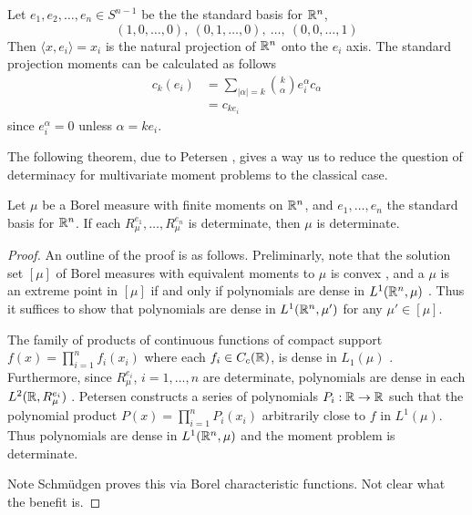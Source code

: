 \begin{myexample}
  Let $e_1, e_2, \ldots, e_n \in S^{n-1}$ be the the standard basis for $\mathbb{R}^n$,
  \[
    (1, 0, \ldots, 0),~ (0, 1, \ldots, 0),~ \ldots,~ (0,0, \ldots, 1)
  \]
  Then $\langle x, e_i \rangle = x_i$ is the natural projection of $\mathbb{R}^n$ onto the $e_i$ axis. The standard projection moments can be calculated as follows
  \begin{align*}
    c_k(e_i) 
    &= \sum_{|\alpha| = k} \binom{k}{\alpha} e_i^\alpha c_\alpha \\
    &= c_{ke_i}
  \end{align*}
  since $e_i^\alpha = 0$ unless $\alpha = ke_i$.
\end{myexample}

The following theorem, due to Petersen \cn, gives a way us to reduce the question of determinacy for multivariate moment problems to the classical case.

\begin{proposition}
  Let $\mu$ be a Borel measure with finite moments on $\mathbb{R}^n$, and $e_1, \ldots, e_n$ the standard basis for $\mathbb{R}^n$. If each $R_\mu^{e_1}, \ldots, R_\mu^{e_n}$ is determinate, then $\mu$ is determinate.
\end{proposition}

\begin{proof}
  An outline of the proof is as follows. Preliminarly, note that the solution set $[\mu]$ of Borel measures with equivalent moments to $\mu$ is convex \cn, and a $\mu$ is an extreme point in $[\mu]$ if and only if polynomials are dense in $L^1(\mathbb{R}^n, \mu)$ \cn. Thus it suffices to show that polynomials are dense in $L^1(\mathbb{R}^n, \mu')$ for any $\mu' \in [\mu]$.
  
  The family of products of continuous functions of compact support $f(x) = \prod_{i=1}^n f_i(x_i)$ where each $f_i \in C_c(\mathbb{R})$, is dense in $L_1(\mu)$ \cn. Furthermore, since $R_\mu^{e_i}$, $i = 1, \ldots, n$ are determinate, polynomials are dense in each $L^2(\mathbb{R}, R_\mu^{e_i})$ \cn. Petersen constructs a series of polynomials $P_i : \mathbb{R} \rightarrow \mathbb{R}$ such that the polynomial product $P(x) = \prod_{i = 1}^n P_i(x_i)$ arbitrarily close to $f$ in $L^1(\mu)$. Thus polynomials are dense in $L^1(\mathbb{R}^n, \mu)$ and the moment problem is determinate. \pn 
  
  Note Schm\"udgen proves this via Borel characteristic functions. Not clear what the benefit is.
\end{proof}

